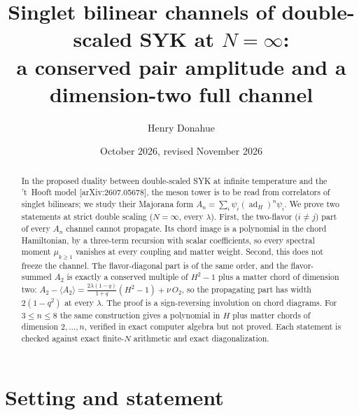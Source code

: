 \documentclass[11pt]{article}
\title{Singlet bilinear channels of double-scaled SYK at $N=\infty$:\\
a conserved pair amplitude and a dimension-two full channel}
\author{Henry Donahue}
\date{October 2026, revised November 2026}
\newcommand{\ad}{\operatorname{ad}}
\begin{document}
\maketitle

\begin{abstract}
In the proposed duality between double-scaled SYK at infinite
temperature and the 't~Hooft model [arXiv:2607.05678], the meson tower
is to be read from correlators of singlet bilinears; we study their
Majorana form $A_n=\sum_i\psi_i(\ad_H)^n\psi_i$. We prove two statements at strict
double scaling ($N=\infty$, every $\lambda$). First, the two-flavor
($i\neq j$) part of every $A_n$ channel cannot propagate. Its chord image
is a polynomial in the chord Hamiltonian, by a three-term recursion with
scalar coefficients, so every spectral moment $\mu_{k\ge1}$ vanishes at
every coupling and matter weight. Second, this does not freeze the
channel. The flavor-diagonal part is of the same order, and the
flavor-summed $A_2$ is exactly a conserved multiple of $H^2-1$ plus a
matter chord of dimension two:
$A_2-\langle A_2\rangle=\tfrac{2\lambda(1-q)}{1+q}(H^2-1)+\nu\,O_2$, so
the propagating part has width $2(1-q^2)$ at every $\lambda$. The proof
is a sign-reversing involution on chord diagrams. For $3\le n\le8$ the
same construction gives a polynomial in $H$ plus matter chords of
dimension $2,\dots,n$, verified in exact computer algebra but not
proved. Each statement is checked against exact finite-$N$ arithmetic
and exact diagonalization.
\end{abstract}

\section{Setting and statement}
\end{document}
